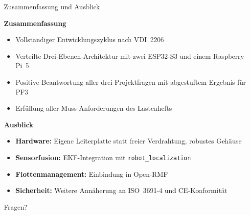 \documentclass[aspectratio=169]{beamer}
\begin{document}
\begin{frame}{Zusammenfassung und Ausblick}

  \textbf{Zusammenfassung}
  \begin{itemize}
    \item Vollständiger Entwicklungszyklus nach VDI~2206
    \item Verteilte Drei-Ebenen-Architektur mit zwei ESP32-S3 und einem
          Raspberry Pi~5
    \item Positive Beantwortung aller drei Projektfragen mit
          abgestuftem Ergebnis für PF3
    \item Erfüllung aller Muss-Anforderungen des Lastenhefts
  \end{itemize}

  \vspace{0.5em}
  \textbf{Ausblick}
  \begin{itemize}
    \item \textbf{Hardware:} Eigene Leiterplatte statt freier
          Verdrahtung, robustes Gehäuse
    \item \textbf{Sensorfusion:} EKF-Integration mit
          \texttt{robot\_localization}
    \item \textbf{Flottenmanagement:} Einbindung in Open-RMF
    \item \textbf{Sicherheit:} Weitere Annäherung an ISO~3691-4 und
          CE-Konformität
  \end{itemize}

\end{frame}


\begin{frame}[standout]
  Fragen?
\end{frame}


\appendix
\end{document}
